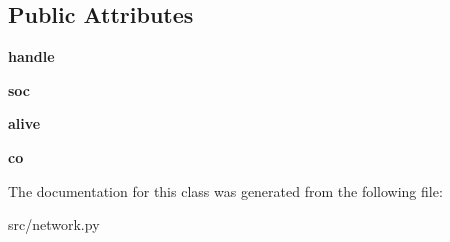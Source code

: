 \subsection*{\-Public \-Attributes}
\begin{DoxyCompactItemize}
\item 
\hypertarget{classsrc_1_1network_1_1_network_server_a69b93e1961b39b8f938935cc180777be}{{\bfseries handle}}\label{classsrc_1_1network_1_1_network_server_a69b93e1961b39b8f938935cc180777be}

\item 
\hypertarget{classsrc_1_1network_1_1_network_server_ad6f4eb2f6a295b6850dab572f0db4292}{{\bfseries soc}}\label{classsrc_1_1network_1_1_network_server_ad6f4eb2f6a295b6850dab572f0db4292}

\item 
\hypertarget{classsrc_1_1network_1_1_network_server_ab384a6e8eca2b22a0d3aef7bb3a8f843}{{\bfseries alive}}\label{classsrc_1_1network_1_1_network_server_ab384a6e8eca2b22a0d3aef7bb3a8f843}

\item 
\hypertarget{classsrc_1_1network_1_1_network_server_ac9dadc4baef43efefe4ceab0e44e4d4c}{{\bfseries co}}\label{classsrc_1_1network_1_1_network_server_ac9dadc4baef43efefe4ceab0e44e4d4c}

\end{DoxyCompactItemize}


\-The documentation for this class was generated from the following file\-:\begin{DoxyCompactItemize}
\item 
src/network.\-py\end{DoxyCompactItemize}
